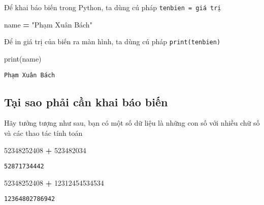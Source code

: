 \documentclass[
]{book}
\newenvironment{Shaded}{\begin{snugshade}}{\end{snugshade}}
\newcommand{\BuiltInTok}[1]{#1}
\newcommand{\DecValTok}[1]{\textcolor[rgb]{0.00,0.00,0.81}{#1}}
\newcommand{\NormalTok}[1]{#1}
\newcommand{\OperatorTok}[1]{\textcolor[rgb]{0.81,0.36,0.00}{\textbf{#1}}}
\newcommand{\StringTok}[1]{\textcolor[rgb]{0.31,0.60,0.02}{#1}}
\begin{document}
Để khai báo biến trong Python, ta dùng cú pháp\hspace{0pt} \texttt{tenbien\ =\ giá\ trị}

\begin{Shaded}
\begin{Highlighting}[]
\NormalTok{name }\OperatorTok{=} \StringTok{"Phạm Xuân Bách"}
\end{Highlighting}
\end{Shaded}

Để in giá trị của biến ra màn hình, ta dùng cú pháp \texttt{print(tenbien)}

\begin{Shaded}
\begin{Highlighting}[]
\BuiltInTok{print}\NormalTok{(name)}
\end{Highlighting}
\end{Shaded}

\begin{verbatim}
Phạm Xuân Bách
\end{verbatim}

\hypertarget{tux1ea1i-sao-phux1ea3i-cux1ea7n-khai-buxe1o-biux1ebfn}{%
\subsection{Tại sao phải cần khai báo biến}\label{tux1ea1i-sao-phux1ea3i-cux1ea7n-khai-buxe1o-biux1ebfn}}

Hãy tưởng tượng như sau, bạn có một số dữ liệu là những con số với nhiều chữ số và các thao tác tính toán

\begin{Shaded}
\begin{Highlighting}[]
\DecValTok{52348252408} \OperatorTok{+} \DecValTok{523482034}
\end{Highlighting}
\end{Shaded}

\begin{verbatim}
52871734442
\end{verbatim}

\begin{Shaded}
\begin{Highlighting}[]
\DecValTok{52348252408} \OperatorTok{+} \DecValTok{12312454534534}
\end{Highlighting}
\end{Shaded}

\begin{verbatim}
12364802786942
\end{verbatim}
\end{document}
